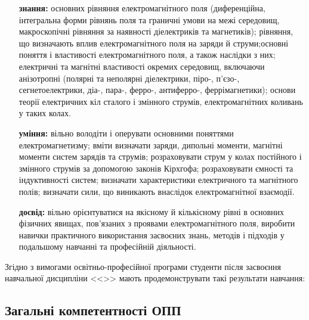 \documentclass{Syllabus}
\begin{document}
\begin{enumerate}
    \item[\bfseries знання:] основних рівняння електромагнітного поля (диференційна, інтегральна форми рівнянь поля та граничні умови на межі середовищ, макроскопічні рівняння за наявності діелектриків та магнетиків); рівняння, що визначають вплив електромагнітного поля на заряди й струми;основні поняття і властивості електромагнітного поля, а також наслідки з них; електричні та магнітні властивості окремих середовищ, включаючи анізотропні (полярні та неполярні діелектрики, піро-, п’єзо-, сегнетоелектрики, діа-, пара-, ферро-, антиферро-, феррімагнетики);	основи теорії електричних кіл сталого і змінного струмів, електромагнітних коливань у таких колах.
    \item[\bfseries уміння:] вільно володіти і оперувати основними поняттями електромагнетизму; вміти визначати заряди, дипольні моменти, магнітні моменти систем зарядів та струмів; розраховувати струм у колах постійного і змінного струмів за допомогою законів Кірхгофа; розраховувати ємності та індуктивності систем; визначати характеристики електричного та магнітного полів; визначати сили, що виникають внаслідок електромагнітної взаємодії.
    \item[\bfseries досвід:] вільно орієнтуватися на якісному й кількісному рівні в основних фізичних явищах, пов’язаних з проявами електромагнітного поля, виробити навички практичного використання засвоєних знань, методів і підходів у подальшому навчанні та професійній діяльності.
\end{enumerate}

Згідно з вимогами освітньо-професійної програми
студенти після засвоєння навчальної дисципліни <<\discipline>> мають продемонструвати такі результати навчання: 

\subsection*{Загальні компетентності ОПП}
\end{document}
